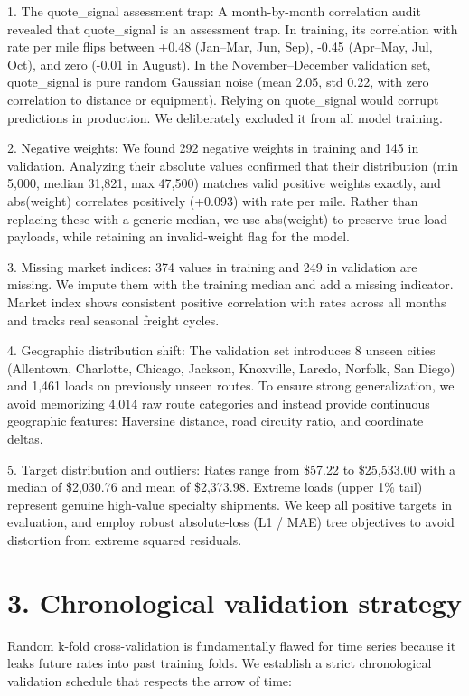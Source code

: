 \documentclass[10pt]{article}
\begin{document}
1. The quote\_signal assessment trap: A month-by-month correlation audit revealed that quote\_signal is an assessment trap. In training, its correlation with rate per mile flips between +0.48 (Jan--Mar, Jun, Sep), -0.45 (Apr--May, Jul, Oct), and zero (-0.01 in August). In the November--December validation set, quote\_signal is pure random Gaussian noise (mean 2.05, std 0.22, with zero correlation to distance or equipment). Relying on quote\_signal would corrupt predictions in production. We deliberately excluded it from all model training.

2. Negative weights: We found 292 negative weights in training and 145 in validation. Analyzing their absolute values confirmed that their distribution (min 5,000, median 31,821, max 47,500) matches valid positive weights exactly, and abs(weight) correlates positively (+0.093) with rate per mile. Rather than replacing these with a generic median, we use abs(weight) to preserve true load payloads, while retaining an invalid-weight flag for the model.

3. Missing market indices: 374 values in training and 249 in validation are missing. We impute them with the training median and add a missing indicator. Market index shows consistent positive correlation with rates across all months and tracks real seasonal freight cycles.

4. Geographic distribution shift: The validation set introduces 8 unseen cities (Allentown, Charlotte, Chicago, Jackson, Knoxville, Laredo, Norfolk, San Diego) and 1,461 loads on previously unseen routes. To ensure strong generalization, we avoid memorizing 4,014 raw route categories and instead provide continuous geographic features: Haversine distance, road circuity ratio, and coordinate deltas.

5. Target distribution and outliers: Rates range from \$57.22 to \$25,533.00 with a median of \$2,030.76 and mean of \$2,373.98. Extreme loads (upper 1\% tail) represent genuine high-value specialty shipments. We keep all positive targets in evaluation, and employ robust absolute-loss (L1 / MAE) tree objectives to avoid distortion from extreme squared residuals.

\section*{3. Chronological validation strategy}
Random k-fold cross-validation is fundamentally flawed for time series because it leaks future rates into past training folds. We establish a strict chronological validation schedule that respects the arrow of time:
\end{document}
